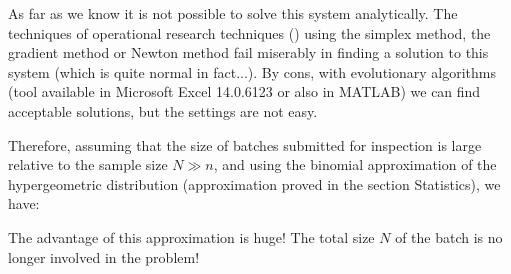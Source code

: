 	As far as we know it is not possible to solve this system analytically. The techniques of operational research techniques  () using the simplex method, the gradient method or Newton method fail miserably in finding a solution to this system (which is quite normal in fact...). By cons, with evolutionary algorithms (tool available in Microsoft Excel 14.0.6123 or also in MATLAB) we can find acceptable solutions, but the settings are not easy.

	Therefore, assuming that the size of batches submitted for inspection is large relative to the sample size $N\gg n$, and using the binomial approximation of the hypergeometric distribution (approximation proved in the section Statistics), we have:
	
	The advantage of this approximation is huge! The total size $N$ of the batch is no longer involved in the problem!

